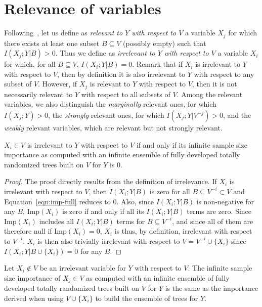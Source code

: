 \section{Relevance of variables}
\label{sec:6:variable-relevance}

Following~\citet{kohavi:1997}, let us define as {\em relevant to $Y$ with
respect to $V$} a variable $X_j$ for which there exists at least one subset $B
\subseteq V$ (possibly empty) such that $I(X_j;Y|B)>0$. Thus we define as {\em
irrelevant to $Y$ with respect to $V$} a variable $X_i$ for which, for all $B
\subseteq V$, $I(X_i; Y|B)=0$. Remark that if $X_i$ is irrelevant to $Y$ with
respect to $V$, then by definition it is also irrelevant to $Y$ with respect to
any subset of $V$. However, if $X_j$ is relevant to $Y$ with respect to $V$,
then it is not necessarily relevant to $Y$ with respect to all  subsets of $V$.
Among the relevant variables, we also distinguish the {\em marginally} relevant
ones, for which $I(X_{j}; Y) > 0$, the  {\em strongly} relevant ones, for which
$I(X_{j}; Y | V^{-j}) > 0$,  and the {\em weakly} relevant variables, which are
relevant but not strongly relevant.

\begin{theorem}\label{thm:irrelevant}
  $X_i \in V$ is irrelevant to $Y$ with respect to $V$ if and only if  its
  infinite sample size importance as computed with an infinite ensemble of fully
  developed totally randomized trees built on $V$ for $Y$ is 0.
\end{theorem}

\begin{proof}
The proof directly results from the definition of irrelevance. If $X_i$ is
irrelevant with respect to $V$, then $I(X_i;Y|B)$ is zero for all $B \subseteq
V^{-i} \subset V$ and Equation~\ref{eqn:imp-full} reduces to $0$. Also, since
$I(X_i;Y|B)$ is non-negative for any $B$, $\text{Imp}(X_i)$ is zero if and only if all
its $I(X_i;Y|B)$ terms are zero. Since $\text{Imp}(X_i)$ includes all $I(X_i;Y|B)$
terms for $B \subseteq V^{-i}$, and since all of them are therefore null if
$\text{Imp}(X_i)=0$,  $X_i$ is thus, by definition, irrelevant with respect to
$V^{-i}$. $X_i$ is then also trivially irrelevant with respect to $V=V^{-i} \cup
\{X_i\}$ since $I(X_i;Y|B\cup\{X_i\})=0$ for any $B$.
\end{proof}

\begin{lemma}\label{lemma:adding-irrelevant}
  Let $X_i \notin V$ be an irrelevant variable for $Y$ with respect to $V$. The infinite
  sample size importance of $X_j \in V$ as computed with an infinite
  ensemble of fully developed totally randomized trees built on $V$ for $Y$ is the
  same as the importance derived when using $V\cup \{X_i\}$ to build the ensemble of trees for $Y$.
\end{lemma}

